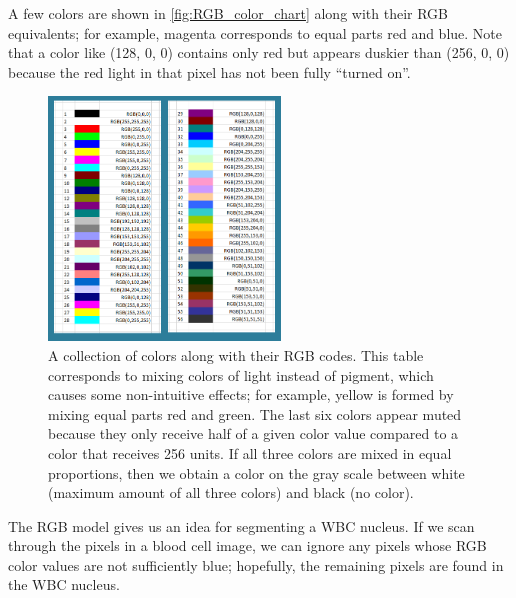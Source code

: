 A few colors are shown in \autoref{fig:RGB_color_chart} along with their RGB equivalents; for example, magenta corresponds to equal parts red and blue. Note that a color like (128, 0, 0) contains only red but appears duskier than (256, 0, 0) because the red light in that pixel has not been fully “turned on”.\\

\begin{figure}[h]
\centering
\mySfFamily
\includegraphics[width = 0.55\textwidth]{../images/RGB_color_chart.png}
\caption{A collection of colors along with their RGB codes. This table corresponds to mixing colors of light instead of pigment, which causes some non-intuitive effects; for example, yellow is formed by mixing equal parts red and green. The last six colors appear muted because they only receive half of a given color value compared to a color that receives 256 units. If all three colors are mixed in equal proportions, then we obtain a color on the gray scale between white (maximum amount of all three colors) and black (no color).}
\label{fig:RGB_color_chart}
\end{figure}

The RGB model gives us an idea for segmenting a WBC nucleus. If we scan through the pixels in a blood cell image, we can ignore any pixels whose RGB color values are not sufficiently blue; hopefully, the remaining pixels are found in the WBC nucleus.\\

\begin{qbox}\end{qbox}

